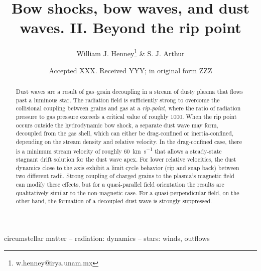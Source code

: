 \documentclass[useAMS, usenatbib, a4paper]{mnras}
\title
{Bow shocks, bow waves, and dust waves. II. Beyond the rip point}
\author[Henney \& Arthur]{
  William J. Henney\thanks{w.henney@irya.unam.mx}
  \& S. J. Arthur\\
  \AddressCRyA
}
\date{Accepted XXX. Received YYY; in original form ZZZ}
\begin{document}
\label{firstpage}
\pagerange{\pageref{firstpage}--\pageref{lastpage}}
\maketitle
\begin{abstract}
  Dust waves are a result of gas--grain decoupling in a stream of
  dusty plasma that flows past a luminous star.  The radiation field
  is sufficiently strong to overcome the collisional coupling between
  grains and gas at a \textit{rip-point}, where the ratio of radiation
  pressure to gas pressure exceeds a critical value of roughly 1000.
  When the rip point occurs outside the hydrodynamic bow shock, a
  separate dust wave may form, decoupled from the gas shell, which can
  either be drag-confined or inertia-confined, depending on the stream
  density and relative velocity.  In the drag-confined case, there is
  a minimum stream velocity of roughly \SI{60}{km.s^{-1}} that allows
  a steady-state stagnant drift solution for the dust wave apex.  For
  lower relative velocities, the dust dynamics close to the axis
  exhibit a limit cycle behavior (rip and snap back) between two
  different radii.  Strong coupling of charged grains to the plasma's
  magnetic field can modify these effects, but for a quasi-parallel
  field orientation the results are qualitatively similar to the
  non-magnetic case. For a quasi-perpendicular field, on the other
  hand, the formation of a decoupled dust wave is strongly suppressed.
\end{abstract}

\begin{keywords}
  circumstellar matter -- radiation: dynamics -- stars: winds, outflows
\end{keywords}
\end{document}
